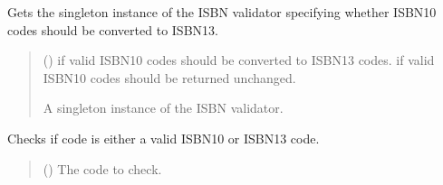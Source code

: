 \documentclass[letterpaper,10pt,english]{sphinxmanual}
\begin{document}
\begin{fulllineitems}
\begin{fulllineitems}
\label{\detokenize{apache_commons_validator_python.routines:apache_commons_validator_python.routines.isbn_validator.ISBNValidator.get_instance}}
\pysigstartsignatures
{}
\pysigstopsignatures
\sphinxAtStartPar
Gets the singleton instance of the ISBN validator specifying whether ISBN\sphinxhyphen{}10
codes should be converted to ISBN\sphinxhyphen{}13.
\begin{quote}\begin{description}
\sphinxAtStartPar
{} () \textendash{}  if valid ISBN\sphinxhyphen{}10 codes should be converted to ISBN\sphinxhyphen{}13 codes.
 if valid ISBN\sphinxhyphen{}10 codes should be returned unchanged.

\sphinxAtStartPar
A singleton instance of the ISBN validator.

\end{description}\end{quote}

\end{fulllineitems}


\begin{fulllineitems}
\label{\detokenize{apache_commons_validator_python.routines:apache_commons_validator_python.routines.isbn_validator.ISBNValidator.is_valid}}
\pysigstartsignatures
{}
\pysigstopsignatures
\sphinxAtStartPar
Checks if code is either a valid ISBN\sphinxhyphen{}10 or ISBN\sphinxhyphen{}13 code.
\begin{quote}\begin{description}
\sphinxAtStartPar
{} () \textendash{} The code to check.


\end{description}
\end{quote}
\end{fulllineitems}
\end{fulllineitems}
\end{document}

